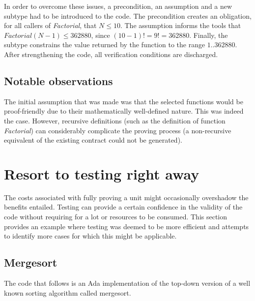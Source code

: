 \documentclass{llncs}
\begin{document}
In order to overcome these issues, a precondition, an assumption and a new
subtype had to be introduced to the code. The precondition creates an obligation,
for all callers of \emph{Factorial}, that $N \leq 10$. The assumption informs the tools
that $Factorial (N - 1) \leq 362880$, since $(10 - 1)! = 9! = 362880$. Finally, the
subtype constrains the value returned by the function to the range $1 .. 362880$.
After strengthening the code, all verification conditions are discharged.




\subsection{Notable observations}
The initial assumption that was made was that the selected functions would be
proof-friendly due to their mathematically well-defined nature. This was indeed
the case. However, recursive definitions (such as the definition of function
\emph{Factorial}) can considerably complicate the proving process (a non-recursive
equivalent of the existing contract could not be generated).



\section{Resort to testing right away}
The costs associated with fully proving a unit might occasionally overshadow
the benefits entailed. Testing can provide a certain confidence in the validity of
the code without requiring for a lot or resources to be consumed. This section provides
an example where testing was deemed to be more efficient and attempts to identify more
cases for which this might be applicable.

\subsection{Mergesort}
The code that follows is an Ada implementation of the top-down version of a well
known sorting algorithm called mergesort.


\end{document}
